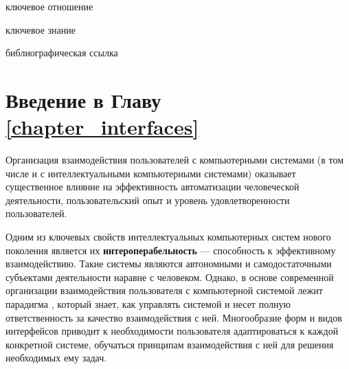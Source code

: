 \begin{SCn}
\begin{scnrelfromlist}{ключевое отношение}
\end{scnrelfromlist}

\begin{scnrelfromlist}{ключевое знание}
\end{scnrelfromlist}

\bigskip

\begin{scnrelfromlist}{библиографическая ссылка}
\end{scnrelfromlist}
\end{SCn}

\section*{Введение в Главу \ref{chapter_interfaces}}

Организация взаимодействия пользователей с компьютерными системами (в том числе и с интеллектуальными компьютерными системами) оказывает существенное влияние на эффективность автоматизации человеческой деятельности, пользовательский опыт и уровень удовлетворенности пользователей. 

Одним из ключевых свойств интеллектуальных компьютерных систем нового поколения является их \textbf{интероперабельность} --- способность к эффективному взаимодействию. Такие системы являются автономными и самодостаточными субъектами деятельности наравне с человеком. Однако, в основе современной организации взаимодействия пользователя с компьютерной системой лежит парадигма , который знает, как управлять системой и несет полную ответственность за качество взаимодействия с ней. Многообразие форм и видов интерфейсов приводит к необходимости пользователя адаптироваться к каждой конкретной системе, обучаться принципам взаимодействия с ней для решения необходимых ему задач.

